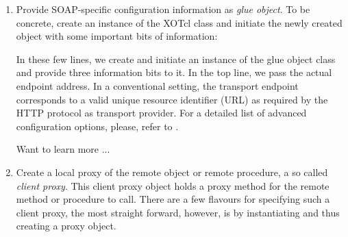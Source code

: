 \begin{enumerate}
\item Provide SOAP-specific configuration information as \emph{glue
    object}. To be concrete, create an instance of the XOTcl class
   and initiate the newly created
  object with some important bits of information:
  \lstset{breaklines=true,numbers=left,basicstyle=\footnotesize,frame=single,tabsize=3}
  

  In these few lines, we create and initiate an instance of the glue
  object class and provide three information bits to it. In the top line, we
  pass the actual endpoint address. In a conventional setting, the
  transport endpoint corresponds to a valid unique resource identifier
  (URL) as required by the HTTP protocol as transport provider. 
  For a detailed list of advanced configuration options, please, refer to
  .

  Want to learn more ...
  
\item Create a local proxy of the remote object or remote procedure, a
  so called \emph{client proxy}. This client proxy object holds a proxy
  method for the remote method or procedure to call. There are a few
  flavours for specifying such a client proxy, the most straight
  forward, however, is by instantiating
   and thus creating a proxy object.
  
  

\end{enumerate}
